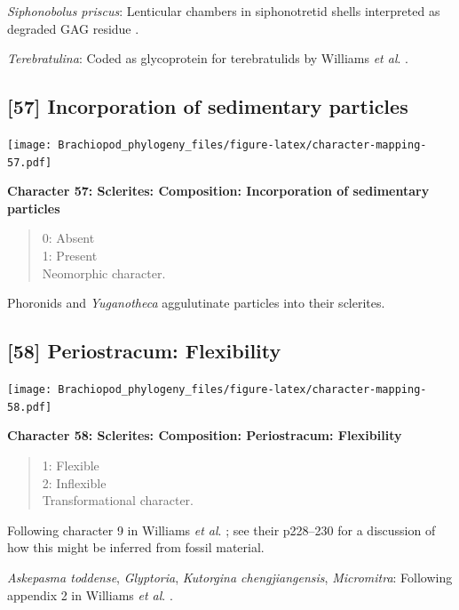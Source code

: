 \documentclass[openany]{book}
\theoremstyle{definition}
\theoremstyle{definition}
\theoremstyle{definition}
\theoremstyle{remark}
\begin{document}
\hypertarget{Siphonobolus_priscus-coding-56}{}
\emph{Siphonobolus priscus}: Lenticular chambers in siphonotretid shells
interpreted as degraded GAG residue
\citep{Williams2004Chemicostructure}.

\hypertarget{Terebratulina-coding-56}{}
\emph{Terebratulina}: Coded as glycoprotein for terebratulids by
Williams \emph{et al}. \citeyearpar{Williams1996Asupra}.

\subsection*{{[}57{]} Incorporation of sedimentary
particles}\label{incorporation-of-sedimentary-particles}

\texttt{[image: Brachiopod\_phylogeny\_files/figure-latex/character-mapping-57.pdf]}

\textbf{Character 57: Sclerites: Composition: Incorporation of
sedimentary particles}

\begin{quote}
0: Absent\\
1: Present\\
Neomorphic character.
\end{quote}

Phoronids and \emph{Yuganotheca} aggulutinate particles into their
sclerites.

\subsection*{{[}58{]} Periostracum:
Flexibility}\label{periostracum-flexibility}

\texttt{[image: Brachiopod\_phylogeny\_files/figure-latex/character-mapping-58.pdf]}

\textbf{Character 58: Sclerites: Composition: Periostracum: Flexibility}

\begin{quote}
1: Flexible\\
2: Inflexible\\
Transformational character.
\end{quote}

Following character 9 in Williams \emph{et al}.
\citeyearpar{Williams1998Thediversity}; see their p228--230 for a
discussion of how this might be inferred from fossil material.

\hypertarget{Askepasma_toddense-coding-58}{}
\emph{Askepasma toddense}, \emph{Glyptoria}, \emph{Kutorgina
chengjiangensis}, \emph{Micromitra}: Following appendix 2 in Williams
\emph{et al}. \citeyearpar{Williams1998Thediversity}.
\end{document}
